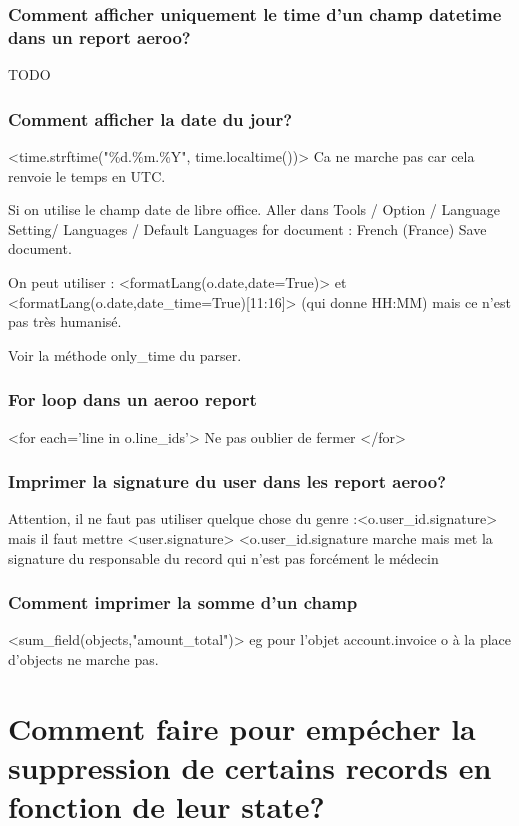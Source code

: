 \documentclass[12pt,a4paper]{article}
\begin{document}
\subsubsection{Comment afficher uniquement le time d'un champ datetime dans un report aeroo?}
\label{sec:only_time}
TODO

\subsubsection{Comment afficher la date du jour?}
\label{sec:today}
<time.strftime("\%d.\%m.\%Y", time.localtime())>
Ca ne marche pas car cela renvoie le temps en UTC.

Si on utilise le champ date de libre office. Aller dans 
Tools / Option / Language Setting/ Languages / Default Languages for document : French (France) Save document.

On peut utiliser : <formatLang(o.date,date=True)> et <formatLang(o.date,date\_time=True)[11:16]> (qui donne HH:MM) mais ce n'est pas très humanisé.

Voir la méthode only\_time du parser.

\subsubsection{For loop dans un aeroo report}
\label{sec:for_loop}

<for each='line in o.line\_ids'>
Ne pas oublier de fermer </for>

\subsubsection{Imprimer la signature du user dans les report aeroo?}
\label{sec:signature_aeroo}

Attention, il ne faut pas utiliser quelque chose du genre :<o.user\_id.signature> mais il faut mettre <user.signature>
<o.user\_id.signature marche mais met la signature du responsable du record qui n'est pas forcément le médecin
\subsubsection{Comment imprimer la somme d'un champ}
\label{sec:sum}

<sum\_field(objects,"amount\_total")> eg pour l'objet account.invoice
o à la place d'objects ne marche pas.  


\section{Comment faire pour empécher la suppression de certains records en fonction de leur state?}
\label{sec:unlink_by_state}
\end{document}
